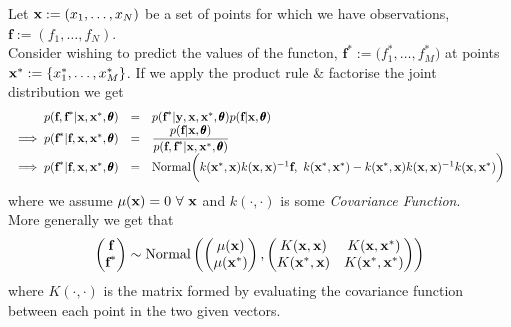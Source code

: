 \documentclass[11pt,a4paper]{article}
\begin{document}
Let $\textbf{x}:=(x_1,\dots,x_N)$ be a set of points for which we have observations, $\textbf{f}:=(f_1,\dots,f_N)$.\\
Consider wishing to predict the values of the functon, ${\textbf{f}^*:=(f^*_1,\dots,f^*_M})$ at points ${\textbf{x}^*:=\{x^*_1,\dots,x^*_M\}}$.
If we apply the product rule \& factorise the joint distribution we get
\[\begin{array}{rcl}
p(\textbf{f},\textbf{f}^*|\x,\x^*,\pmb\theta)&=&p(\textbf{f}^*|\textbf{y},\x,\x^*,\pmb\theta)p(\textbf{f}|\x,\pmb\theta)\\
\implies p(\textbf{f}^*|\textbf{f},\x,\x^*,\pmb\theta)&=&\dfrac{p(\textbf{f}|\x,\pmb\theta)}{p(\textbf{f},\textbf{f}^*|\x,\x^*,\pmb\theta)}\\
\implies p(\textbf{f}^*|\textbf{f},\x,\x^*,\pmb\theta)&=&\text{Normal}\bigg(k(\x^*,\x)k(\x,\x)^{-1}\textbf{f},\ k(\x^*,\x^*)-k(\x^*,\x)k(\x,\x)^{-1}k(\x,\x^*)\bigg)
\end{array}\]
where we assume $\mu(\textbf{x})=0\ \forall\ \textbf{x}$ and $k(\cdot,\cdot)$ is some \textit{Covariance Function}.\\
More generally we get that
$$\begin{pmatrix}\textbf{f}\\\textbf{f}^*\end{pmatrix}\sim\text{Normal}\left(\begin{pmatrix}\mu(\textbf{x})\\\mu(\textbf{x}^*)\end{pmatrix},\begin{pmatrix}K(\textbf{x},\textbf{x})&K(\textbf{x},\textbf{x}^*)\\K(\textbf{x}^*,\textbf{x})&K(\textbf{x}^*,\textbf{x}^*)\end{pmatrix}\right)$$
where $K(\cdot,\cdot)$ is the matrix formed by evaluating the covariance function between each point in the two given vectors.\\
\end{document}
